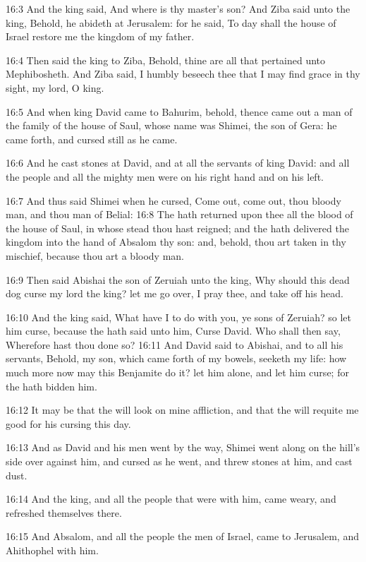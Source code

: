 16:3 And the king said, And where is thy master's son? And Ziba said unto the king, Behold, he abideth at Jerusalem: for he said, To day shall the house of Israel restore me the kingdom of my father.

16:4 Then said the king to Ziba, Behold, thine are all that pertained unto Mephibosheth. And Ziba said, I humbly beseech thee that I may find grace in thy sight, my lord, O king.

16:5 And when king David came to Bahurim, behold, thence came out a man of the family of the house of Saul, whose name was Shimei, the son of Gera: he came forth, and cursed still as he came.

16:6 And he cast stones at David, and at all the servants of king David: and all the people and all the mighty men were on his right hand and on his left.

16:7 And thus said Shimei when he cursed, Come out, come out, thou bloody man, and thou man of Belial: 16:8 The \LORD hath returned upon thee all the blood of the house of Saul, in whose stead thou hast reigned; and the \LORD hath delivered the kingdom into the hand of Absalom thy son: and, behold, thou art taken in thy mischief, because thou art a bloody man.

16:9 Then said Abishai the son of Zeruiah unto the king, Why should this dead dog curse my lord the king? let me go over, I pray thee, and take off his head.

16:10 And the king said, What have I to do with you, ye sons of Zeruiah?  so let him curse, because the \LORD hath said unto him, Curse David. Who shall then say, Wherefore hast thou done so?  16:11 And David said to Abishai, and to all his servants, Behold, my son, which came forth of my bowels, seeketh my life: how much more now may this Benjamite do it? let him alone, and let him curse; for the \LORD hath bidden him.

16:12 It may be that the \LORD will look on mine affliction, and that the \LORD will requite me good for his cursing this day.

16:13 And as David and his men went by the way, Shimei went along on the hill's side over against him, and cursed as he went, and threw stones at him, and cast dust.

16:14 And the king, and all the people that were with him, came weary, and refreshed themselves there.

16:15 And Absalom, and all the people the men of Israel, came to Jerusalem, and Ahithophel with him.

